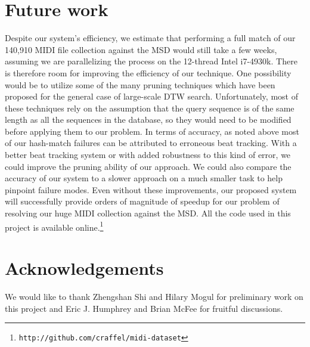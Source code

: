 \documentclass{article}
\begin{document}
\section{Future work}

Despite our system's efficiency, we estimate that performing a full match of our 140,910 MIDI file collection against the MSD would still take a few weeks, assuming we are parallelizing the process on the 12-thread Intel i7-4930k.
There is therefore room for improving the efficiency of our technique.
One possibility would be to utilize some of the many pruning techniques which have been proposed for the general case of large-scale DTW search.
Unfortunately, most of these techniques rely on the assumption that the query sequence is of the same length as all the sequences in the database, so they would need to be modified before applying them to our problem.
In terms of accuracy, as noted above most of our hash-match failures can be attributed to erroneous beat tracking.
With a better beat tracking system or with added robustness to this kind of error, we could improve the pruning ability of our approach.
We could also compare the accuracy of our system to a slower approach on a much smaller task to help pinpoint failure modes.
Even without these improvements, our proposed system will successfully provide orders of magnitude of speedup for our problem of resolving our huge MIDI collection against the MSD.
All the code used in this project is available online.\footnote{\texttt{http://github.com/craffel/midi-dataset}}

\section{Acknowledgements}

We would like to thank Zhengshan Shi and Hilary Mogul for preliminary work on this project and Eric J. Humphrey and Brian McFee for fruitful discussions.


\end{document}
